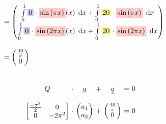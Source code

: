 \documentclass[
final,
a4paper,
oneside,
parskip=full,
headings=standardclasses,
headings=big,
pointednumbers,
fleqn
]{scrartcl}
\newcommand{\tfilly}[1]{\tfillc[#1][yellow!40]}
\newcommand{\tfillr}[1]{\tfillc[#1][red!20]}
\newcommand{\tfillv}[1]{\tfillc[#1][Violet!20]}
\newcommand*\difx{\; \mathop{}\!\mathrm{d}x}
\newcommand{\f}[2]{\frac{#1}{#2}}
\newcommand{\kl}[1]{{\left( #1 \right)}}
\begin{document}
{\begin{align*}
\begin{array}{ll}
            & \\
            & = \begin{pmatrix}
                \int\limits_{0}^{1}{\tfillv{$0$}       \cdot \tfillr{$\sin\kl{\pi x}$}\kl{x} \difx} +
                \int\limits_{0}^{1}{\tfilly{$20$}      \cdot \tfillr{$\sin\kl{\pi x}$} \difx} \\
                \int\limits_{0}^{1}{\tfillv{$0$}       \cdot \tfillr{$\sin\kl{2 \pi x}$}\kl{x} \difx} +
                \int\limits_{0}^{1}{\tfilly{$20$}      \cdot \tfillr{$\sin\kl{2 \pi x}$} \difx}
            \end{pmatrix} \\
            & \\
            & = \begin{pmatrix}
                \f{40}{\pi} \\
                0
            \end{pmatrix}
        \end{array}
    \end{align*}} \\
    {\setlength{\abovedisplayskip}{6pt}
    \setlength{\belowdisplayskip}{-12pt}
    \begin{align*}
        \begin{array}{c@{\ }c@{\ }c@{\ }c@{\ }c@{\ }c@{\ }l}
            Q & \cdot & \uline{a} & + & \uline{q} & = & 0 \\
            \\
            \begin{bmatrix}
                \f{-\pi^2}{2} & 0 \\
                0             & -2\pi^2
            \end{bmatrix} & \cdot &
            \begin{pmatrix}
                a_1 \\
                a_2
            \end{pmatrix} & + &
            \begin{pmatrix}
                \f{40}{\pi} \\
                0
            \end{pmatrix} & = & 0
            \\
        \end{array}
    \end{align*}} \\
\end{document}

